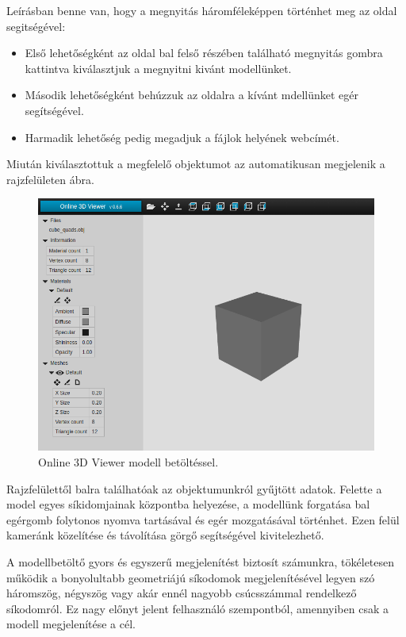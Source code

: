 Leírásban benne van, hogy a megnyitás háromféleképpen történhet meg az oldal segitségével:
\begin{itemize}
\item Első lehetőségként az oldal bal felső részében található megnyitás gombra kattintva kiválasztjuk a megnyitni kivánt modellünket.
\item Második lehetőségként behúzzuk az oldalra a kívánt mdellünket egér segítségével.
\item Harmadik lehetőség pedig megadjuk a fájlok helyének webcímét.
\end{itemize}
\newpage
Miután kiválasztottuk a megfelelő objektumot az automatikusan megjelenik a rajzfelületen  ábra.
\bigskip
\begin{figure}[h]
\centering
\includegraphics[width=\textwidth]{images/Model_Viewer_2.png}
\caption{Online 3D Viewer modell betöltéssel.}
\label{fig:model_viewer2}
\end{figure}
\bigskip

Rajzfelülettől balra találhatóak az objektumunkról gyűjtött adatok. Felette a model egyes síkidomjainak központba helyezése, a modellünk forgatása bal egérgomb folytonos nyomva tartásával és egér mozgatásával történhet. Ezen felül kameránk közelítése és távolítása görgő segítségével kivitelezhető.

A modellbetöltő gyors és egyszerű megjelenítést biztosít számunkra, tökéletesen működik a bonyolultabb geometriájú síkodomok megjelenítésével legyen szó háromszög, négyszög vagy akár ennél nagyobb csúcsszámmal rendelkező síkodomról. Ez nagy előnyt jelent felhasználó szempontból, amennyiben csak a modell megjelenítése a cél.

